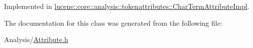 Implemented in \mbox{\hyperlink{classlucene_1_1core_1_1analysis_1_1tokenattributes_1_1CharTermAttributeImpl_a286d2dd38ce24fb0da4c077e8f06bb25}{lucene\+::core\+::analysis\+::tokenattributes\+::\+Char\+Term\+Attribute\+Impl}}.



The documentation for this class was generated from the following file\+:\begin{DoxyCompactItemize}
\item 
Analysis/\mbox{\hyperlink{Analysis_2Attribute_8h}{Attribute.\+h}}\end{DoxyCompactItemize}

